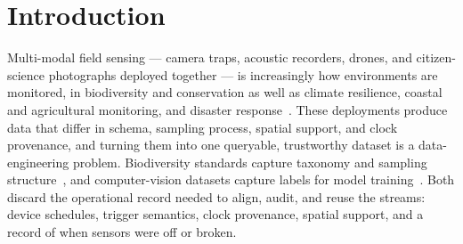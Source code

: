 \documentclass[sigconf]{acmart}
\newif\ifreviewmode
\begin{document}


\maketitle
\ifreviewmode
  \noindent{\footnotesize\textcolor{red}{Draft last updated 2026-10-26 \textbullet{} snapshot \texttt{darwin\_core\_latest\_20261008}}}\par
\fi
\pagestyle{plain}

\ifreviewmode
  \begingroup
  \setcounter{tocdepth}{2}
  \footnotesize
  \tableofcontents
  \endgroup
\fi

\section{Introduction}
\label{sec:introduction}

Multi-modal field sensing --- camera traps, acoustic recorders, drones,
and citizen-science photographs deployed together --- is increasingly
how environments are monitored, in biodiversity and conservation as well
as climate resilience, coastal and agricultural monitoring, and
disaster response~\cite{pollock2026roam,lahozmonfort2021monitoring}.
These deployments produce data that differ in schema, sampling process,
spatial support, and clock provenance, and turning them into one
queryable, trustworthy dataset is a data-engineering problem.
Biodiversity standards capture taxonomy and sampling
structure~\cite{wieczorek2012darwincore,ahumada2020wildlifeinsights},
and computer-vision datasets capture labels for model
training~\cite{liang2021multibench}. Both discard the operational record
needed to align, audit, and reuse the streams: device schedules,
trigger semantics, clock provenance, spatial support, and a record of
when sensors were off or broken.
\end{document}
